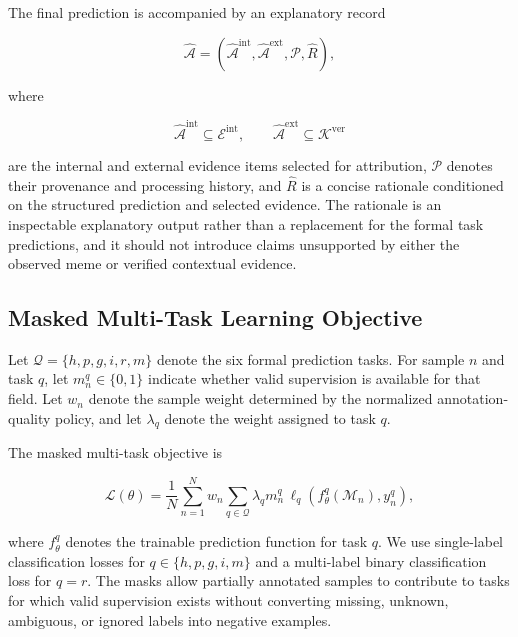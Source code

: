 The final prediction is accompanied by an explanatory record

\begin{equation}
\hat{\mathcal{A}}
=
\left(
\hat{\mathcal{A}}^{\mathrm{int}},
\hat{\mathcal{A}}^{\mathrm{ext}},
\mathcal{P},
\hat{R}
\right),
\label{eq:explanation_output}
\end{equation}

where

\begin{equation}
\hat{\mathcal{A}}^{\mathrm{int}}
\subseteq
\mathcal{E}^{\mathrm{int}},
\qquad
\hat{\mathcal{A}}^{\mathrm{ext}}
\subseteq
\mathcal{K}^{\mathrm{ver}}
\end{equation}

are the internal and external evidence items selected for
attribution, $\mathcal{P}$ denotes their provenance and processing
history, and $\hat{R}$ is a concise rationale conditioned on the
structured prediction and selected evidence.
The rationale is an inspectable explanatory output rather than a
replacement for the formal task predictions, and it should not
introduce claims unsupported by either the observed meme or
verified contextual evidence.

\subsection{Masked Multi-Task Learning Objective}
\label{sec:problem:objective}

Let
$\mathcal{Q}=\{h,p,g,i,r,m\}$ denote the six formal prediction
tasks.
For sample $n$ and task $q$, let
$m_n^q\in\{0,1\}$ indicate whether valid supervision is available
for that field.
Let $w_n$ denote the sample weight determined by the normalized
annotation-quality policy, and let $\lambda_q$ denote the weight
assigned to task $q$.

The masked multi-task objective is

\begin{equation}
\mathcal{L}(\theta)
=
\frac{1}{N}
\sum_{n=1}^{N}
w_n
\sum_{q\in\mathcal{Q}}
\lambda_q m_n^q
\,
\ell_q
\left(
f_\theta^q(\mathcal{M}_n),
y_n^q
\right),
\label{eq:multitask_objective}
\end{equation}

where $f_\theta^q$ denotes the trainable prediction function for
task $q$.
We use single-label classification losses for
$q\in\{h,p,g,i,m\}$ and a multi-label binary classification loss
for $q=r$.
The masks allow partially annotated samples to contribute to tasks
for which valid supervision exists without converting missing,
unknown, ambiguous, or ignored labels into negative examples.

